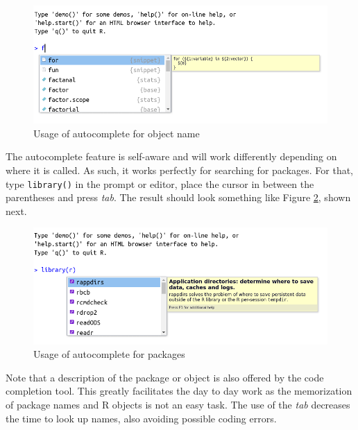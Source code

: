 \documentclass[
  12pt,
]{book}
\begin{document}
\begin{figure}[!htbp]

{\centering \includegraphics[width=1\linewidth]{figs/autocomplete_objects} 

}

\caption{Usage of autocomplete for object name}\label{fig:autocomplete-objects}
\end{figure}

The autocomplete feature is self-aware and will work differently depending on where it is called. As such, it works perfectly for searching for packages. For that, type \texttt{library()} in the prompt or editor, place the cursor in between the parentheses and press \emph{tab}. The result should look something like Figure \ref{fig:autocomplete-packages}, shown next.

\begin{figure}[!htbp]

{\centering \includegraphics[width=1\linewidth]{figs/autocomplete_packages} 

}

\caption{Usage of autocomplete for packages}\label{fig:autocomplete-packages}
\end{figure}

Note that a description of the package or object is also offered by the code completion tool. This greatly facilitates the day to day work as the memorization of package names and R objects is not an easy task. The use of the \emph{tab} decreases the time to look up names, also avoiding possible coding errors.
\end{document}
